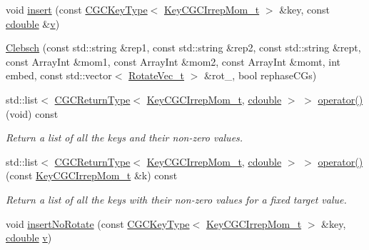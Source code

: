 \begin{DoxyCompactItemize}
\item 
void \mbox{\hyperlink{classHadron_1_1CGC_1_1CGCIrrepMomLGxLGtoLGEnv_1_1Clebsch_a4d4ec2ede98509ab49ac04fe23ef2ea8}{insert}} (const \mbox{\hyperlink{structHadron_1_1CGCKeyType}{C\+G\+C\+Key\+Type}}$<$ \mbox{\hyperlink{structHadron_1_1KeyCGCIrrepMom__t}{Key\+C\+G\+C\+Irrep\+Mom\+\_\+t}} $>$ \&key, const \mbox{\hyperlink{namespaceHadron_1_1CGC_a52d2b70e6792726fb525eab94daae53b}{cdouble}} \&\mbox{\hyperlink{adat__devel_2lib_2hadron_2hadron__timeslice_8cc_a716fc87f5e814be3ceee2405ed6ff22a}{v}})
\item 
\mbox{\hyperlink{classHadron_1_1CGC_1_1CGCIrrepMomLGxLGtoLGEnv_1_1Clebsch_aec8b07c8384bf303329f17cac780ba25}{Clebsch}} (const std\+::string \&rep1, const std\+::string \&rep2, const std\+::string \&rept, const Array\+Int \&mom1, const Array\+Int \&mom2, const Array\+Int \&momt, int embed, const std\+::vector$<$ \mbox{\hyperlink{structHadron_1_1RotateVec__t}{Rotate\+Vec\+\_\+t}} $>$ \&rot\+\_\+, bool rephase\+C\+Gs)
\item 
std\+::list$<$ \mbox{\hyperlink{structHadron_1_1CGCReturnType}{C\+G\+C\+Return\+Type}}$<$ \mbox{\hyperlink{structHadron_1_1KeyCGCIrrepMom__t}{Key\+C\+G\+C\+Irrep\+Mom\+\_\+t}}, \mbox{\hyperlink{namespaceHadron_1_1CGC_a52d2b70e6792726fb525eab94daae53b}{cdouble}} $>$ $>$ \mbox{\hyperlink{classHadron_1_1CGC_1_1CGCIrrepMomLGxLGtoLGEnv_1_1Clebsch_a27a81332c929b1f421704680e794b796}{operator()}} (void) const
\begin{DoxyCompactList}\small\item\em Return a list of all the keys and their non-\/zero values. \end{DoxyCompactList}\item 
std\+::list$<$ \mbox{\hyperlink{structHadron_1_1CGCReturnType}{C\+G\+C\+Return\+Type}}$<$ \mbox{\hyperlink{structHadron_1_1KeyCGCIrrepMom__t}{Key\+C\+G\+C\+Irrep\+Mom\+\_\+t}}, \mbox{\hyperlink{namespaceHadron_1_1CGC_a52d2b70e6792726fb525eab94daae53b}{cdouble}} $>$ $>$ \mbox{\hyperlink{classHadron_1_1CGC_1_1CGCIrrepMomLGxLGtoLGEnv_1_1Clebsch_a8a003db7855154fba35df2485da43353}{operator()}} (const \mbox{\hyperlink{structHadron_1_1KeyCGCIrrepMom__t}{Key\+C\+G\+C\+Irrep\+Mom\+\_\+t}} \&k) const
\begin{DoxyCompactList}\small\item\em Return a list of all the keys with their non-\/zero values for a fixed target value. \end{DoxyCompactList}\item 
void \mbox{\hyperlink{classHadron_1_1CGC_1_1CGCIrrepMomLGxLGtoLGEnv_1_1Clebsch_a57c67efaf6fb826157a5c19a4066959e}{insert\+No\+Rotate}} (const \mbox{\hyperlink{structHadron_1_1CGCKeyType}{C\+G\+C\+Key\+Type}}$<$ \mbox{\hyperlink{structHadron_1_1KeyCGCIrrepMom__t}{Key\+C\+G\+C\+Irrep\+Mom\+\_\+t}} $>$ \&key, \mbox{\hyperlink{namespaceHadron_1_1CGC_a52d2b70e6792726fb525eab94daae53b}{cdouble}} \mbox{\hyperlink{adat__devel_2lib_2hadron_2hadron__timeslice_8cc_a716fc87f5e814be3ceee2405ed6ff22a}{v}})

\end{DoxyCompactItemize}
